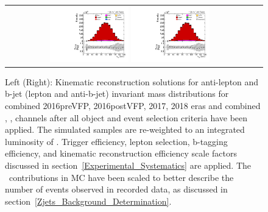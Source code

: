 \begin{figure}[htb]
    \begin{center}
        \begin{tabular}{cc}
            \includegraphics[width=0.325\textwidth]{fig_fullRun2UL/controlplots/combined/HypAntiLeptonBjetMass.pdf}
            \includegraphics[width=0.325\textwidth]{fig_fullRun2UL/controlplots/combined/HypLeptonBjetMass.pdf}
        \end{tabular}
        \caption{\footnotesize Left (Right): Kinematic reconstruction solutions for anti-lepton and b-jet (lepton and anti-b-jet) invariant mass distributions for combined 2016preVFP, 2016postVFP, 2017, 2018 eras and combined \ee, \emu, \mumu channels after all object and event selection criteria have been applied.
        The simulated samples are re-weighted to an integrated luminosity of \lumivalueRuniiUL.
        Trigger efficiency, lepton selection, b-tagging efficiency, and kinematic reconstruction efficiency scale factors discussed in section~\ref{Experimental_Systematics} are applied.
        The \zjets\ contributions in MC have been scaled to better describe the number of events observed in recorded data, as discussed in section~\ref{Zjets_Background_Determination}.
        }
    \end{center}
\end{figure}

